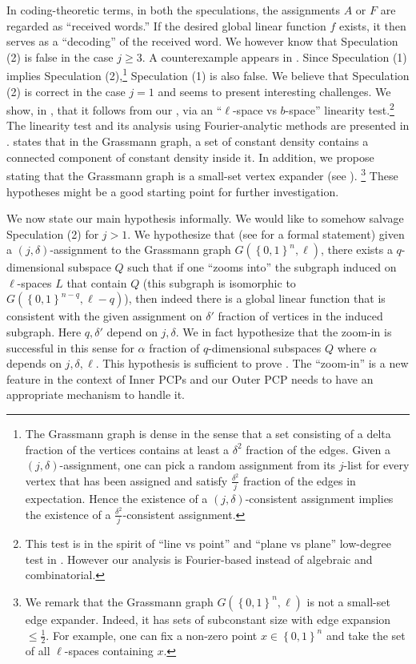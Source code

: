 \documentclass{toc}
\newcommand\set[1]{{\left\{ #1 \right\}}}
\newcommand\power[1]{\set{0,1}^{#1}}
\renewcommand\geq{\geqslant}
\renewcommand\leq{\leqslant}
\begin{document}
\medskip In coding-theoretic terms,
in both the speculations, the assignments $A$ or $F$ are regarded as ``received words.''
If the desired global linear function $f$ exists, it then serves as a ``decoding'' of the received word.
We however know that Speculation (2) is false in the case $j \geq 3$. A counterexample appears in . Since
Speculation (1) implies Speculation (2),\footnote{The Grassmann graph is
dense in the sense that a set %
%
consisting of a delta fraction of the vertices %
contains at least
a   %
$\delta^2$ fraction of the edges. Given a $(j,\delta)$-assignment,
one can pick a random assignment from its $j$-list for every vertex that has been assigned
and satisfy $\frac{\delta^2}{j}$ fraction of the edges in
expectation. Hence
the %
existence of
a $(j,\delta)$-consistent assignment implies
the %
existence of a $\frac{\delta^2}{j}$-consistent assignment.} Speculation (1) is also false.
We believe that Speculation (2) is correct in the case $j=1$ and
seems to present interesting challenges. We show, in , that
 it follows from our , via
%
an  %
 ``$\ell$-space vs $b$-space''
linearity test.\footnote{This test is in the spirit of ``line vs point'' and
``plane vs plane'' low-degree test in \cite{RS96,AS98,RS97}.
 However our analysis is Fourier-based instead of algebraic and combinatorial.}
The linearity test and its analysis using Fourier-analytic methods are presented in .
 states that in the Grassmann graph, a set of
constant density contains a connected component of constant density inside it.
In addition, we propose  stating
that the Grassmann graph is a small-set vertex expander
(see ).%
%
\footnote{We remark that the Grassmann graph $G(\power{n},\ell)$
is not a small-set edge expander.
Indeed, it has sets of subconstant size with edge expansion $\leq \frac{1}{2}$.
For example, one can fix a non-zero point $x \in \power{n}$ and take
the set of all $\ell$-spaces containing $x$.}
These hypotheses might be a good starting point for further investigation.

We now state our main hypothesis informally. We would like to somehow salvage Speculation (2) for $j>1$. We hypothesize that (see  for a formal statement)
given a $(j,\delta)$-assignment to the Grassmann graph $G(\power{n}, \ell)$, there exists a $q$-dimensional subspace $Q$ such that if one
``zooms into'' the subgraph induced on $\ell$-spaces $L$ that contain $Q$ (this subgraph is isomorphic to $G(\power{n-q}, \ell-q)$), then indeed
there is a global linear function that is consistent with the given assignment on $\delta'$ fraction of vertices in the induced subgraph.
Here $q, \delta'$ depend on $j,\delta$. We in fact hypothesize that the zoom-in is successful in this sense for $\alpha$ fraction of $q$-dimensional
subspaces $Q$ where $\alpha$ depends on $j,\delta, \ell$. This hypothesis is sufficient to prove .
The ``zoom-in'' is a new feature in the context of Inner PCPs and our
Outer PCP needs to have an appropriate mechanism to handle it.
\end{document}
